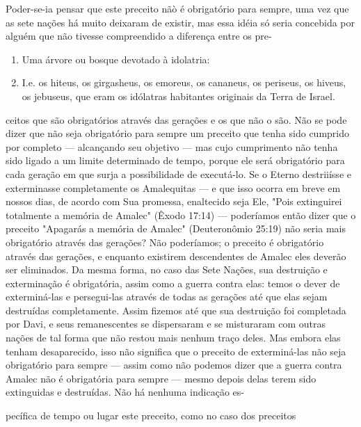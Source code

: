 \begin{itemize}
\begin{enumrate}
\begin{itemize}
\begin{itemize}
\begin{itemize}
Poder-se-ia pensar que este preceito nãò é obrigatório para sempre, uma
vez que as sete nações há muito deixaram de existir, mas essa idéia só
seria concebida por alguém que não tivesse compreendido a diferença
entre os pre-


\begin{enumerate}
\def\labelenumi{\arabic{enumi}.}
\setcounter{enumi}{191}
\item
 
 Uma árvore ou bosque devotado à idolatria:
 
\item
 
 I.e. os hiteus, os girgasheus, os emoreus, os cananeus, os periseus,
 os hiveus, os jebuseus, que eram os idólatras habitantes originais da
 Terra de Israel.
 
\end{enumerate}

ceitos que são obrigatórios através das gerações e os que não o são. Não
se po­de dizer que não seja obrigatório para sempre um preceito que
tenha sido cum­prido por completo --- alcançando seu objetivo --- mas
cujo cumprimento não tenha sido ligado a um limite determinado de tempo,
porque ele será obrigató­rio para cada geração em que surja a
possibilidade de executá-lo. Se o Eterno destriiísse e exterminasse
completamente os Amalequitas --- e que isso ocorra em breve em nossos
dias, de acordo com Sua promessa, enaltecido seja Ele, "Pois extinguirei
totalmente a memória de Amalec" (Êxodo 17:14) --- podería­mos então
dizer que o preceito "Apagarás a memória de Amalec" (Deuteronô­mio
25:19) não seria mais obrigatório através das gerações? Não poderíamos;
o preceito é obrigatório através das gerações, e enquanto existirem
descenden­tes de Amalec eles deverão ser eliminados. Da mesma forma, no
caso das Sete Nações, sua destruição e exterminação é obrigatória, assim
como a guerra con­tra elas: temos o dever de exterminá-las e
persegui-las através de todas as gera­ções até que elas sejam destruídas
completamente. Assim fizemos até que sua destruição foi completada por
Davi, e seus remanescentes se dispersaram e se misturaram com outras
nações de tal forma que não restou mais nenhum traço deles. Mas embora
elas tenham desaparecido, isso não significa que o preceito de
exterminá-las não seja obrigatório para sempre --- assim como não
podemos dizer que a guerra contra Amalec não é obrigatória para sempre
--- mesmo de­pois delas terem sido extinguidas e destruídas. Não há
nenhuma indicação es-

pecífica de tempo ou lugar este preceito, como no caso dos preceitos


\end{itemize}
\end{itemize}
\end{itemize}
\end{enumrate}
\end{itemize}
